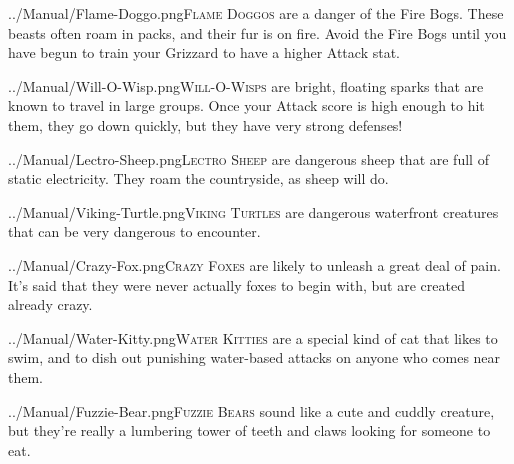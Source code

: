 \documentclass[10pt,twocolumn,openany,article]{memoir}
\begin{document}
\begin{description}
\vspace{14pt}

\lettrine[image=true,  lines=5, findent=3pt, nindent=3pt]{../Manual/Flame-Doggo.png}{Flame Doggos}
are a  danger of the  Fire Bogs. These beasts  often roam in  packs, and
their fur is on fire. Avoid the  Fire Bogs until you have begun to train
your Grizzard to have a higher Attack stat.

\vspace{14pt}

\lettrine[image=true, lines=5, findent=3pt, nindent=3pt]{../Manual/Will-O-Wisp.png}{Will-O-Wisps}
are bright,  floating sparks that are  known to travel in  large groups.
Once your Attack score is high enough to hit them, they go down quickly,
but they have very strong defenses!

\vspace{14pt}

\lettrine[image=true, lines=5, findent=3pt, nindent=3pt]{../Manual/Lectro-Sheep.png}{Lectro Sheep}
are dangerous sheep  that are full of static electricity.  They roam the
countryside, as sheep will do.

\pagebreak

\lettrine[image=true,       lines=5, findent=3pt, nindent=3pt]{../Manual/Viking-Turtle.png}{Viking
  Turtles} are dangerous waterfront creatures that can be very dangerous
to encounter.

\vspace{14pt}

\lettrine[image=true, lines=5, findent=3pt, nindent=3pt]{../Manual/Crazy-Fox.png}{Crazy Foxes} are
likely to unleash a  great deal of pain. It's said  that they were never
actually foxes to begin with, but are created already crazy.

\vspace{14pt}

\lettrine[image=true, lines=5, findent=3pt, nindent=3pt]{../Manual/Water-Kitty.png}{Water Kitties}
are a special kind of cat that  likes to swim, and to dish out punishing
water-based attacks on anyone who comes near them.

\vspace{14pt}

\lettrine[image=true,  lines=5, findent=3pt, nindent=3pt]{../Manual/Fuzzie-Bear.png}{Fuzzie Bears}
sound like  a cute and cuddly  creature, but they're really  a lumbering
tower of teeth and claws looking for someone to eat.

\vspace{14pt}


\end{description}
\end{document}
